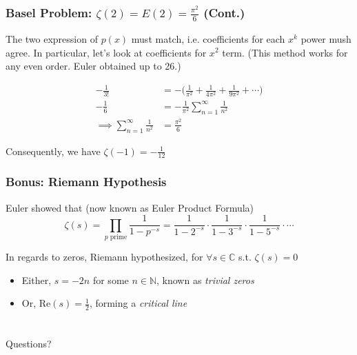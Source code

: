 \documentclass{beamer}
\begin{document}
\begin{frame}
\frametitle{Basel Problem: $ \zeta(2) = E(2) = \frac{\pi^2}{6} $ (Cont.)}

The two expression of $p(x)$ must match, i.e. coefficients for each $x^k$ power mush agree. In particular, let's look at coefficients for $x^2$ term. (This method works for any even order. Euler obtained up to 26.)

\begin{align*}
    -\frac{1}{3!} &= - \big( \frac{1}{\pi^2} + \frac{1}{4\pi^2} + \frac{1}{9\pi^2} + \cdots \big) \\ 
    -\frac{1}{6}  &= - \frac{1}{\pi^2} \sum_{n=1}^{\infty} \frac{1}{n^2} \\ 
    \implies \sum_{n=1}^{\infty} \frac{1}{n^2} &= \frac{\pi^2}{6}
\end{align*}

Consequently, we have \alert{ $ \zeta(-1) = -\frac{1}{12} $ }

\end{frame}


\begin{frame}
\frametitle{Bonus: Riemann Hypothesis}

Euler showed that (now known as Euler Product Formula)
$$ \zeta(s) 
= \prod_{p \text{ prime}} \frac{1}{1 - p^{-s}} 
= \frac{1}{1 - 2^{-s}} \cdot \frac{1}{1 - 3^{-s}} \cdot \frac{1}{1 - 5^{-s}} \cdot \cdots $$

In regards to zeros, Riemann hypothesized, for $ \forall s \in \mathbb{C} $ s.t. $ \zeta(s) = 0 $
\begin{itemize}
    \item Either, $ s = -2n $ for some $ n \in \mathbb{N} $, known as \emph{trivial zeros} 
    \item Or, $ \text{Re}(s) = \frac{1}{2} $, forming a \emph{critical line}
\end{itemize}

\end{frame}


\section*{}
\begin{frame}
\Huge{\centerline{Questions?}}
\end{frame}

\end{document}
